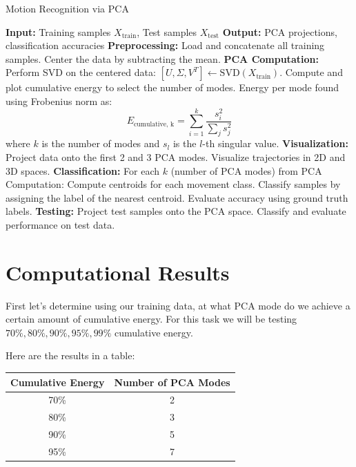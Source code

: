 \documentclass[11pt]{amsart}
\begin{document}
\begin{algorithm}
    \caption{Motion Recognition via PCA}
    \begin{algorithmic}[1]
    \State \textbf{Input:} Training samples $X_{\text{train}}$, Test samples $X_{\text{test}}$
    \State \textbf{Output:} PCA projections, classification accuracies
    \medskip
    \State \textbf{Preprocessing:}
        \State \quad Load and concatenate all training samples.
        \State \quad Center the data by subtracting the mean.
    \medskip
    \State \textbf{PCA Computation:}
        \State \quad Perform SVD on the centered data: $[U, \Sigma, V^T] \gets \text{SVD}(X_{\text{train}})$.
        \State \quad Compute and plot cumulative energy to select the number of modes.
        \State \quad Energy per mode found using Frobenius norm as: \[E_{\text{cumulative, k}} = \sum_{i = 1}^{k} \frac{s_i^2}{\sum_{j} s_j^2}\]
        where $k$ is the number of modes and $s_l$ is the $l$-th singular value.
    \medskip
    \State \textbf{Visualization:}
        \State \quad Project data onto the first 2 and 3 PCA modes.
        \State \quad Visualize trajectories in 2D and 3D spaces.
    \medskip
    \State \textbf{Classification:}
        \State \quad For each $k$ (number of PCA modes) from PCA Computation:
            \State \quad \quad Compute centroids for each movement class.
            \State \quad \quad Classify samples by assigning the label of the nearest centroid.
            \State \quad \quad Evaluate accuracy using ground truth labels.
    \medskip
    \State \textbf{Testing:}
        \State \quad Project test samples onto the PCA space.
        \State \quad Classify and evaluate performance on test data.
    \end{algorithmic}
    \end{algorithm}

\section{Computational Results}\label{sec:Results}

First let's determine using our training data, at what PCA mode do we achieve a certain amount of cumulative energy. For this task we will be testing $70\%, 80\%, 90\%, 95\%, 99\%$ cumulative energy.

Here are the results in a table:

\begin{table}[h]
    \centering
    \begin{tabular}{|c|c|}
    \hline
    \textbf{Cumulative Energy} & \textbf{Number of PCA Modes} \\ \hline
    70\%                       & 2                            \\ \hline
    80\%                       & 3                            \\ \hline
    90\%                       & 5                            \\ \hline
    95\%                       & 7                           \\ \hline
    \end{tabular}
\end{table}
\end{document}
